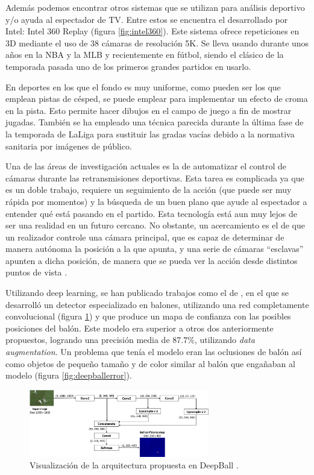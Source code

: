 Además podemos encontrar otros sistemas que se utilizan para análisis deportivo y/o ayuda al espectador de TV. Entre estos se encuentra el desarrollado por Intel: Intel 360 Replay (figura \ref{fig:intel360}). Este sistema ofrece repeticiones en 3D mediante el uso de 38 cámaras de resolución 5K. Se lleva usando durante unos años en la NBA y la MLB y recientemente en fútbol, siendo el clásico de la temporada pasada uno de los primeros grandes partidos en usarlo.

En deportes en los que el fondo es muy uniforme, como pueden ser los que emplean pistas de césped, se puede emplear para implementar un efecto de croma en la pista. Esto permite hacer dibujos en el campo de juego a fin de mostrar jugadas. También se ha empleado una técnica parecida durante la última fase de la temporada de LaLiga para sustituir las gradas vacías debido a la normativa sanitaria por imágenes de público.

Una de las áreas de investigación actuales es la de automatizar el control de cámaras durante las retransmisiones deportivas. Esta tarea es complicada ya que es un doble trabajo, requiere un seguimiento de la acción (que puede ser muy rápida por momentos) y la búsqueda de un buen plano que ayude al espectador a entender qué está pasando en el partido. Esta tecnología está aun muy lejos de ser una realidad en un futuro cercano. No obstante, un acercamiento es el de que un realizador controle una cámara principal, que es capaz de determinar de manera autónoma la posición a la que apunta, y una serie de cámaras ``esclavas'' apunten a dicha posición, de manera que se pueda ver la acción desde distintos puntos de vista \cite{book:cvInSports}.

Utilizando deep learning, se han publicado trabajos como el de \citet{art:DeepBall}, en el que se desarrolló un detector especializado en balones, utilizando una red completamente convolucional (figura \ref{fig:deepball}) y que produce un mapa de confianza con las posibles posiciones del balón. Este modelo era superior a otros dos anteriormente propuestos, logrando una precisión media de $87.7\%$, utilizando \textit{data augmentation}. Un problema que tenía el modelo eran las oclusiones de balón así como objetos de pequeño tamaño y de color similar al balón que engañaban al modelo (figura \ref{fig:deepballerror}).

\begin{figure}
    \centering
    \includegraphics[width=0.7\textwidth]{images/deepball}
    \caption{Visualización de la arquitectura propuesta en DeepBall \cite{art:DeepBall}.}
    \label{fig:deepball}
\end{figure}



